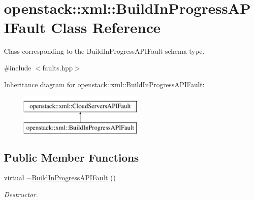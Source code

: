 \hypertarget{classopenstack_1_1xml_1_1BuildInProgressAPIFault}{
\section{openstack::xml::BuildInProgressAPIFault Class Reference}
\label{classopenstack_1_1xml_1_1BuildInProgressAPIFault}
}


Class corresponding to the BuildInProgressAPIFault schema type.  




{\ttfamily \#include $<$faults.hpp$>$}

Inheritance diagram for openstack::xml::BuildInProgressAPIFault:\begin{figure}[H]
\begin{center}
\leavevmode
\includegraphics[height=2.000000cm]{classopenstack_1_1xml_1_1BuildInProgressAPIFault}
\end{center}
\end{figure}
\subsection*{Public Member Functions}
\begin{DoxyCompactItemize}
\item 
\hypertarget{classopenstack_1_1xml_1_1BuildInProgressAPIFault_af8a125c1fd799566766080cabef092cc}{
virtual \hyperlink{classopenstack_1_1xml_1_1BuildInProgressAPIFault_af8a125c1fd799566766080cabef092cc}{$\sim$BuildInProgressAPIFault} ()}
\label{classopenstack_1_1xml_1_1BuildInProgressAPIFault_af8a125c1fd799566766080cabef092cc}

\begin{DoxyCompactList}\small\item\em Destructor. \item\end{DoxyCompactList}\end{DoxyCompactItemize}
